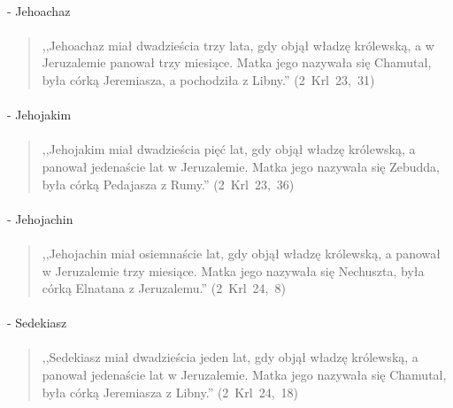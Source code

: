 \documentclass[10pt,a4paper,oneside]{article}
\begin{document}
\paragraph{}
- Jehoachaz
\paragraph{}
\begin{quote}
,,Jehoachaz miał dwadzieścia trzy lata, gdy objął władzę królewską, a w Jeruzalemie panował trzy miesiące. Matka jego nazywała się Chamutal, była córką Jeremiasza, a pochodziła z Libny.'' \mbox{(2 Krl 23, 31)}
\end{quote}
\paragraph{}
- Jehojakim
\paragraph{}
\begin{quote}
,,Jehojakim miał dwadzieścia pięć lat, gdy objął władzę królewską, a panował jedenaście lat w Jeruzalemie. Matka jego nazywała się Zebudda, była córką Pedajasza z Rumy.'' \mbox{(2 Krl 23, 36)}
\end{quote}
\paragraph{}
- Jehojachin
\paragraph{}
\begin{quote}
,,Jehojachin miał osiemnaście lat, gdy objął władzę królewską, a panował w Jeruzalemie trzy miesiące. Matka jego nazywała się Nechuszta, była córką Elnatana z Jeruzalemu.'' \mbox{(2 Krl 24, 8)}
\end{quote}
\paragraph{}
- Sedekiasz
\paragraph{}
\begin{quote}
,,Sedekiasz miał dwadzieścia jeden lat, gdy objął władzę królewską, a panował jedenaście lat w Jeruzalemie. Matka jego nazywała się Chamutal, była córką Jeremiasza z Libny.'' \mbox{(2 Krl 24, 18)}
\end{quote}
\end{document}
